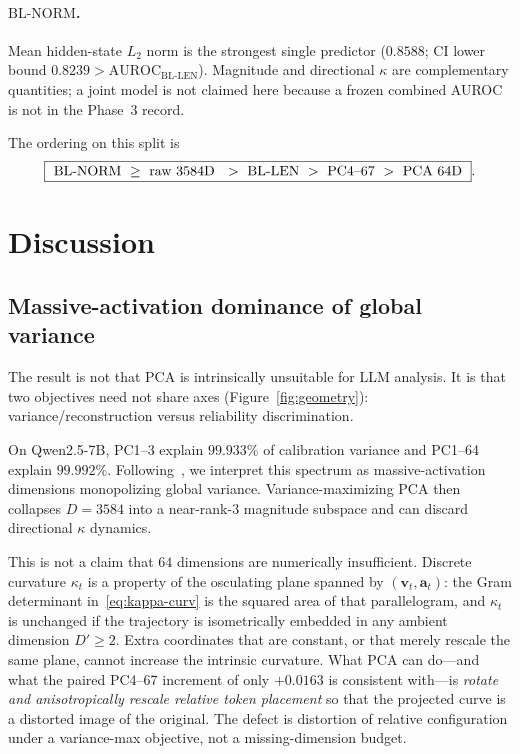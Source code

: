 \documentclass{article}
\newcommand{\auroc}{\mathrm{AUROC}}
\newcommand{\bllen}{\mathrm{BL\text{-}LEN}}
\newcommand{\blnorm}{\mathrm{BL\text{-}NORM}}
\begin{document}
\paragraph{$\blnorm$.}
Mean hidden-state $L_2$ norm is the strongest single predictor ($0.8588$; {CI} lower bound $0.8239>\auroc_{\bllen}$). Magnitude and directional $\kappa$ are complementary quantities; a joint model is not claimed here because a frozen combined AUROC is not in the Phase~3 record.

The ordering on this split is
\begin{equation}
\boxed{\
  \blnorm
  \ \ge\
  \text{raw }3584\text{D }
  \ >\
  \bllen
  \ >\
  \text{{PC4--}67}
  \ >\
  \text{{PCA }64\text{D}}
\ }.
\label{eq:ordering}
\end{equation}

\section{Discussion}
\label{sec:disc}

\subsection{Massive-activation dominance of global variance}
\label{sec:disc-var}

The result is not that {PCA} is intrinsically unsuitable for {LLM} analysis. It is that two objectives need not share axes (Figure~\ref{fig:geometry}): variance/reconstruction versus reliability discrimination.

On Qwen2.5-7B, {PC1}--{3} explain $99.933\%$ of calibration variance and {PC1}--{64} explain $99.992\%$. Following~\citet{sun2024massive}, we interpret this spectrum as massive-activation dimensions monopolizing global variance. Variance-maximizing {PCA} then collapses $D=3584$ into a near-rank-$3$ magnitude subspace and can discard directional $\kappa$ dynamics.

This is not a claim that $64$ dimensions are numerically insufficient. Discrete curvature $\kappa_t$ is a property of the osculating plane spanned by $(\mathbf{v}_t,\mathbf{a}_t)$: the Gram determinant in~\eqref{eq:kappa-curv} is the squared area of that parallelogram, and $\kappa_t$ is unchanged if the trajectory is isometrically embedded in any ambient dimension $D'\ge 2$. Extra coordinates that are constant, or that merely rescale the same plane, cannot increase the intrinsic curvature. What {PCA} can do---and what the paired {PC4}--{67} increment of only $+0.0163$ is consistent with---is \emph{rotate and anisotropically rescale relative token placement} so that the projected curve is a distorted image of the original. The defect is distortion of relative configuration under a variance-max objective, not a missing-dimension budget.
\end{document}
